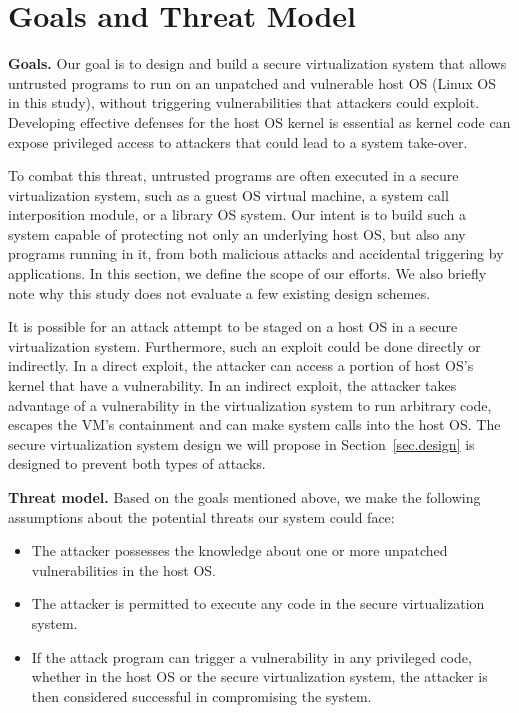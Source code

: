 \section{Goals and Threat Model}
\label{sec.motivation-and-background}

\textbf{Goals.}
Our goal is to design and build a secure virtualization system that allows
untrusted programs to run on an unpatched and vulnerable host OS (Linux OS in
this study), without triggering vulnerabilities that attackers could exploit.
Developing effective defenses for the host OS kernel is essential as kernel code
can expose privileged access to attackers that could lead to a system take-over.

To combat this threat, untrusted programs are often executed in a 
secure virtualization system, such as a guest OS virtual machine, a system call 
interposition module, or a library OS system. Our intent is to
build such a system capable of protecting not only
an underlying host OS, but also any programs running in it, from both 
malicious attacks
and accidental triggering by applications.  
In this section, we define the scope of our efforts. We also briefly note why 
this study does not evaluate a few existing design schemes.

It is possible for an attack attempt to be staged
on a host OS in a secure virtualization system.
Furthermore, %
such an exploit could be done directly or indirectly.
In a direct exploit, the attacker can access a portion of host OS's kernel
that have a vulnerability. In an indirect exploit,
the attacker takes advantage of a vulnerability in the virtualization system to 
run arbitrary code, escapes the VM's containment and can 
make system calls into the host OS. 
The secure virtualization system design we will propose
in Section~\ref{sec.design} is designed to prevent both types of attacks.

\noindent
\textbf{Threat model.}
Based on the goals mentioned above, we make the following assumptions about the
potential threats our system could face:

\begin{itemize}\setlength\itemsep{0em}

\item The attacker possesses the knowledge about one or more unpatched 
vulnerabilities in the host OS.

\item The attacker is permitted to execute any code in the secure 
virtualization system.

\item If the attack program can trigger a vulnerability in any privileged 
code, whether in the host OS or the secure virtualization system, the attacker 
is then considered successful in compromising the system.

\end{itemize}

